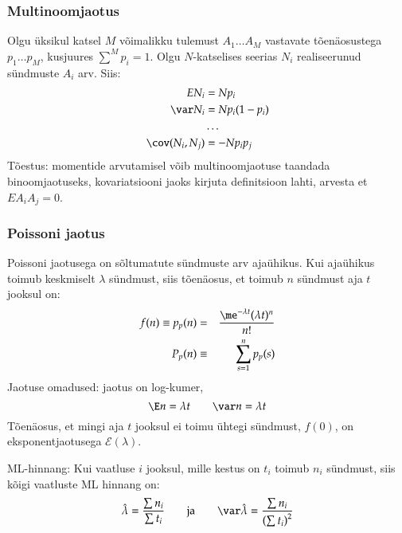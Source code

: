\documentclass[a4paper]{article}
\numberwithin{equation}{subsection}
\begin{document}
\subsubsection{Multinoomjaotus}
Olgu üksikul katsel $M$ võimalikku tulemust $A_1 \ldots A_M$ vastavate
tõenäosustega $p_1 \ldots p_M$, kusjuures $\sum^M p_i = 1$.  Olgu
$N$-katselises seerias $N_i$  realiseerunud sündmuste $A_i$ arv.
Siis:
\begin{align}
E N_i &= Np_i \\
\var N_i &= N p_i ( 1 - p_i) \\
&\ldots \notag\\
\cov( N_i, N_j) &= -N p_i p_j
\end{align}
Tõestus: momentide arvutamisel võib multinoomjaotuse taandada
binoomjaotuseks, kovariatsiooni jaoks kirjuta definitsioon lahti,
arvesta et $E A_i A_j = 0$.


\subsubsection{Poissoni jaotus}
Poissoni jaotusega on sõltumatute sündmuste arv ajaühikus.  Kui
ajaühikus toimub keskmiselt $\lambda$ sündmust, siis tõenäosus, et
toimub $n$ sündmust aja $t$ jooksul on:
\begin{eqnarray}
f(n)\equiv p_p(n) &=& \frac{\me^{-\lambda t}(\lambda t)^n}{n!}\\
P_p(n) &\equiv& \sum_{s=1}^n p_p(s)
\end{eqnarray}
Jaotuse omadused: jaotus on log-kumer,
\begin{equation}
  \E n = \lambda t \qquad \var n = \lambda t
\end{equation}
Tõenäosus, et mingi aja $t$ jooksul ei toimu ühtegi sündmust, $f(0)$, on
eksponentjaotusega $\mathcal{E}(\lambda)$.

ML-hinnang: Kui vaatluse $i$ jooksul, mille kestus on $t_i$ 
toimub $n_i$ sündmust, siis kõigi vaatluste ML hinnang on:
\begin{equation}
  \hat\lambda = \frac{\sum n_i}{\sum t_i} 
  \qquad \mbox{ja} \qquad
  \var\hat\lambda = \frac{\sum n_i}{\left( \sum t_i \right)^2}
\end{equation}
\end{document}
